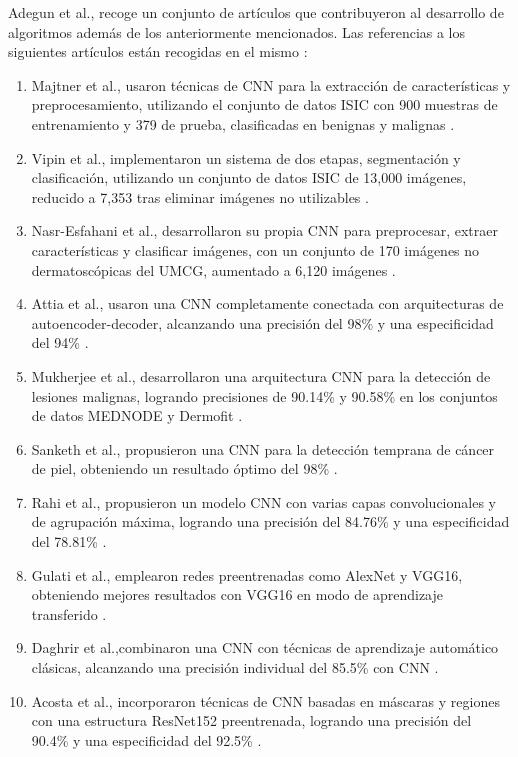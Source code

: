 Adegun et al.,  recoge un conjunto de artículos que contribuyeron al desarrollo de algoritmos además de los anteriormente mencionados. Las referencias a los siguientes artículos están recogidas en el mismo :

\begin{enumerate}
    \item Majtner et al., usaron técnicas de CNN para la extracción de características y preprocesamiento, utilizando el conjunto de datos ISIC con 900 muestras de entrenamiento y 379 de prueba, clasificadas en benignas y malignas . 

    \item Vipin et al.,  implementaron un sistema de dos etapas, segmentación y clasificación, utilizando un conjunto de datos ISIC de 13,000 imágenes, reducido a 7,353 tras eliminar imágenes no utilizables . 

    \item Nasr-Esfahani et al.,  desarrollaron su propia CNN para preprocesar, extraer características y clasificar imágenes, con un conjunto de 170 imágenes no dermatoscópicas del UMCG, aumentado a 6,120 imágenes . 

    \item Attia et al., usaron una CNN completamente conectada con arquitecturas de autoencoder-decoder, alcanzando una precisión del 98\% y una especificidad del 94\% . 

    \item Mukherjee et al., desarrollaron una arquitectura CNN para la detección de lesiones malignas, logrando precisiones de 90.14\% y 90.58\% en los conjuntos de datos MEDNODE y Dermofit . 

    \item Sanketh et al., propusieron una CNN para la detección temprana de cáncer de piel, obteniendo un resultado óptimo del 98\% . 

    \item Rahi et al., propusieron un modelo CNN con varias capas convolucionales y de agrupación máxima, logrando una precisión del 84.76\% y una especificidad del 78.81\% . 

    \item Gulati et al., emplearon redes preentrenadas como AlexNet y VGG16, obteniendo mejores resultados con VGG16 en modo de aprendizaje transferido .
    \item Daghrir et al.,combinaron una CNN con técnicas de aprendizaje automático clásicas, alcanzando una precisión individual del 85.5\% con CNN . 

    \item Acosta et al., incorporaron técnicas de CNN basadas en máscaras y regiones con una estructura ResNet152 preentrenada, logrando una precisión del 90.4\% y una especificidad del 92.5\% .

\end{enumerate}

